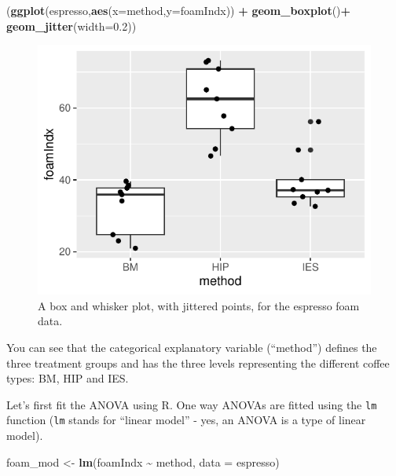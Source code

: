 \documentclass[
  a4paperpaper,
]{book}
\newenvironment{Shaded}{\begin{snugshade}}{\end{snugshade}}
\newcommand{\DataTypeTok}[1]{\textcolor[rgb]{0.13,0.29,0.53}{#1}}
\newcommand{\FloatTok}[1]{\textcolor[rgb]{0.00,0.00,0.81}{#1}}
\newcommand{\KeywordTok}[1]{\textcolor[rgb]{0.13,0.29,0.53}{\textbf{#1}}}
\newcommand{\NormalTok}[1]{#1}
\newcommand{\OperatorTok}[1]{\textcolor[rgb]{0.81,0.36,0.00}{\textbf{#1}}}
\newcommand{\StringTok}[1]{\textcolor[rgb]{0.31,0.60,0.02}{#1}}
\begin{document}
\begin{Shaded}
\begin{Highlighting}[]
\NormalTok{(}\KeywordTok{ggplot}\NormalTok{(espresso,}\KeywordTok{aes}\NormalTok{(}\DataTypeTok{x=}\NormalTok{method,}\DataTypeTok{y=}\NormalTok{foamIndx)) }\OperatorTok{+}\StringTok{ }
\KeywordTok{geom\_boxplot}\NormalTok{()}\OperatorTok{+}
\KeywordTok{geom\_jitter}\NormalTok{(}\DataTypeTok{width=}\FloatTok{0.2}\NormalTok{))}
\end{Highlighting}
\end{Shaded}

\begin{figure}

{\centering \includegraphics{BB852_files/figure-latex/coffee-1} 

}

\caption{A box and whisker plot, with jittered points, for the espresso foam data.}\label{fig:coffee}
\end{figure}

You can see that the categorical explanatory variable (``method'') defines the three treatment groups and has the three levels representing the different coffee types: BM, HIP and IES.

Let's first fit the ANOVA using R. One way ANOVAs are fitted using the \texttt{lm} function (\texttt{lm} stands for ``linear model'' - yes, an ANOVA is a type of linear model).

\begin{Shaded}
\begin{Highlighting}[]
\NormalTok{foam\_mod \textless{}{-}}\StringTok{ }\KeywordTok{lm}\NormalTok{(foamIndx }\OperatorTok{\textasciitilde{}}\StringTok{ }\NormalTok{method, }\DataTypeTok{data =}\NormalTok{ espresso)}
\end{Highlighting}
\end{Shaded}
\end{document}
